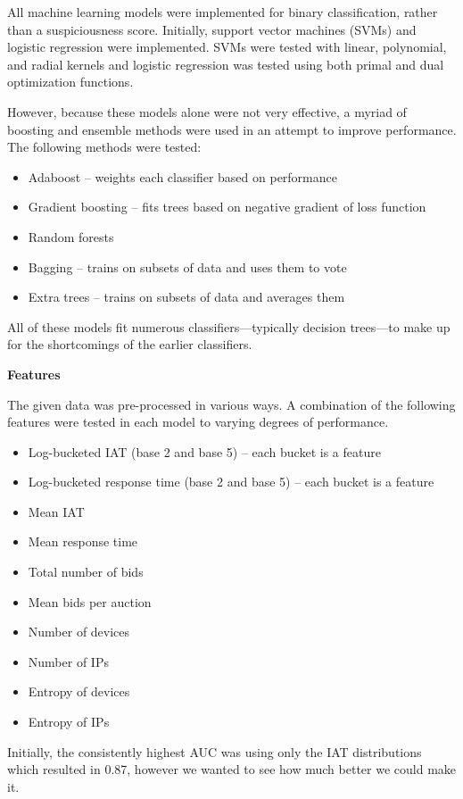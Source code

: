 \documentclass{article} %
\begin{document}
All machine learning models were implemented for binary classification, rather than a suspiciousness score.
Initially, support vector machines (SVMs) and logistic regression were implemented.
SVMs were tested with linear, polynomial, and radial kernels and logistic regression was tested using both primal and dual optimization functions.

However, because these models alone were not very effective, a myriad of boosting and ensemble methods were used in an attempt to improve performance.
The following methods were tested:

\begin{itemize}
\item Adaboost -- weights each classifier based on performance
\item Gradient boosting -- fits trees based on negative gradient of loss function
\item Random forests
\item Bagging -- trains on subsets of data and uses them to vote
\item Extra trees -- trains on subsets of data and averages them
\end{itemize}

All of these models fit numerous classifiers---typically decision trees---to make up for the shortcomings of the earlier classifiers.

\textbf{Features}

The given data was pre-processed in various ways.
A combination of the following features were tested in each model to varying degrees of performance.

\begin{itemize}
\item Log-bucketed IAT (base 2 and base 5) -- each bucket is a feature
\item Log-bucketed response time (base 2 and base 5) -- each bucket is a feature
\item Mean IAT
\item Mean response time
\item Total number of bids
\item Mean bids per auction
\item Number of devices
\item Number of IPs
\item Entropy of devices
\item Entropy of IPs
\end{itemize}

Initially, the consistently highest AUC was using only the IAT distributions which resulted in 0.87, however we wanted to see how much better we could make it.
\end{document}
